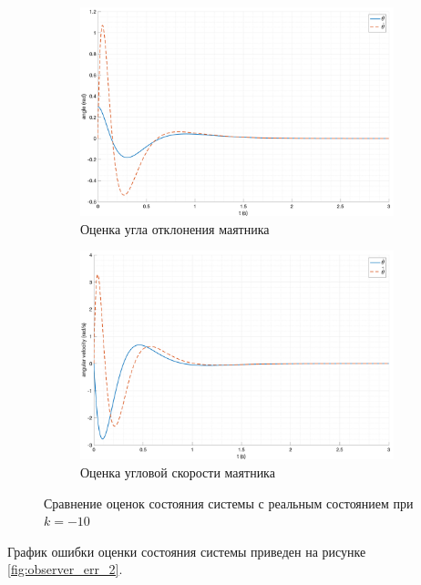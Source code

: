\begin{figure}[ht!]
\begin{subfigure}[b]{0.45\textwidth}
        \includegraphics[width=\textwidth]{media/plots/modal_observer/observer_theta_cmp_2.png}
        \caption{Оценка угла отклонения маятника}
        \label{fig:observer_theta_cmp_2}
    \end{subfigure}
    \begin{subfigure}[b]{0.45\textwidth}
        \includegraphics[width=\textwidth]{media/plots/modal_observer/observer_dottheta_cmp_2.png}
        \caption{Оценка угловой скорости маятника}
        \label{fig:observer_dottheta_cmp_2}
    \end{subfigure}
    \caption{Сравнение оценок состояния системы с реальным состоянием при $k = -10$}
    \label{fig:observer_x_cmp_2_sep}
\end{figure}
График ошибки оценки состояния системы приведен на рисунке \ref{fig:observer_err_2}.
